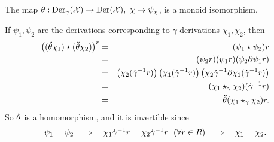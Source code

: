 \begin{lem} \label{lem:wgamma-to-w} 
The map $\ddot{\theta} : \mathrm{Der}_{\gamma}(\mathcal{X}) \to \mathrm{Der}(\mathcal{X}),~ \chi \mapsto \psi_{\chi}$, 
is a monoid isomorphism. 
\end{lem} 
\begin{pf} 
If $\psi_1,\psi_2$ are the derivations corresponding to $\gamma$-derivations 
$\chi_1,\chi_2$, then 
\begin{eqnarray*} 
\left((\ddot{\theta}\chi_1) \star (\ddot{\theta}\chi_2)\right)^r 
  &=&  (\psi_1 \star \psi_2)r \\ 
  &=&  (\psi_2r)(\psi_1r)(\psi_2\partial\psi_1r) \\ 
  &=&  \left( \chi_2(\dot{\gamma}^{-1}r) \right) \left( \chi_1(\dot{\gamma}^{-1}r) \right) 
               \left( \chi_2\dot{\gamma}^{-1}\partial\chi_1(\dot{\gamma}^{-1}r) \right) \\ 
  &=&  (\chi_1 \star_{\gamma} \chi_2)(\dot{\gamma}^{-1}r) \\ 
  &=&  \ddot{\theta}(\chi_1 \star_{\gamma} \chi_2)r. 
\end{eqnarray*}
So $\ddot{\theta}$ is a homomorphism, and it is invertible since 
$$
\psi_1 = \psi_2  
\quad \Rightarrow \quad 
\chi_1\dot{\gamma}^{-1}r = \chi_2\dot{\gamma}^{-1}r ~~ (\forall r \in R)  
\quad \Rightarrow \quad 
\chi_1 = \chi_2. 
$$
\end{pf} 

